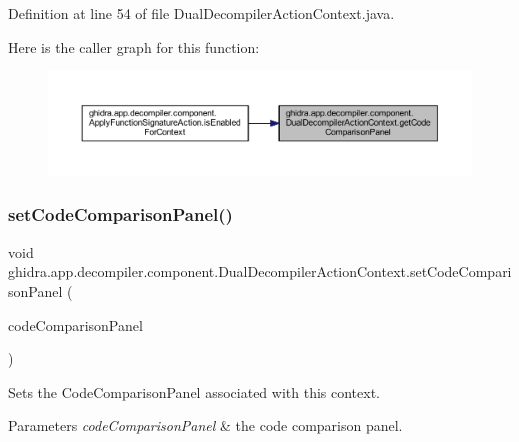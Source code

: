 Definition at line 54 of file Dual\+Decompiler\+Action\+Context.\+java.

Here is the caller graph for this function\+:
\nopagebreak
\begin{figure}[H]
\begin{center}
\leavevmode
\includegraphics[width=350pt]{classghidra_1_1app_1_1decompiler_1_1component_1_1_dual_decompiler_action_context_ac5b3336556c9a6d64a186fa3d59c0efd_icgraph}
\end{center}
\end{figure}
\mbox{\label{classghidra_1_1app_1_1decompiler_1_1component_1_1_dual_decompiler_action_context_a26c24ff804bd30e3f81b459dcb8fbe4d}} 
\subsubsection{\texorpdfstring{setCodeComparisonPanel()}{setCodeComparisonPanel()}}
{\footnotesize\ttfamily void ghidra.\+app.\+decompiler.\+component.\+Dual\+Decompiler\+Action\+Context.\+set\+Code\+Comparison\+Panel (\begin{DoxyParamCaption}\item[{Code\+Comparison\+Panel$<$? extends Field\+Panel\+Coordinator $>$}]{code\+Comparison\+Panel }\end{DoxyParamCaption})\hspace{0.3cm}{\ttfamily [inline]}}

Sets the Code\+Comparison\+Panel associated with this context. 
\begin{DoxyParams}{Parameters}
{\em code\+Comparison\+Panel} & the code comparison panel. \\
\hline
\end{DoxyParams}


